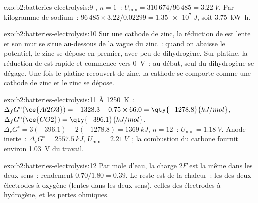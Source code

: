\begin{solution}{exo:b2:batteries-electrolysis:9}
, $n = 1$~: $U_{\min} = 310\,674/96\,485 = \qty{3.22}{V}$.
Par kilogramme de sodium~: $96\,485 \times 3.22/0.02299 = \qty{1.35e7}{J}$, soit
\qty{3.75}{kW.h}.
\end{solution}

\begin{solution}{exo:b2:batteries-electrolysis:10}
Sur une cathode de zinc, la réduction de  est lente et son mur se situe au-dessous de la
vague du zinc~: quand on abaisse le potentiel, le zinc se dépose en premier, avec peu de
dihydrogène. Sur platine, la réduction de  est rapide et commence vers
\qty{0}{V}~: au début, seul du dihydrogène se dégage. Une fois le platine recouvert de
zinc, la cathode se comporte comme une cathode de zinc et le zinc se dépose.
\end{solution}

\begin{solution}{exo:b2:batteries-electrolysis:11}
À \qty{1250}{K}~: $\Delta_f G^\circ(\ce{Al2O3}) = -1328.3 + 0.75 \times 66.0 =
\qty{-1278.8}{kJ/mol}$, $\Delta_f G^\circ(\ce{CO2}) = \qty{-396.1}{kJ/mol}$. $\Delta_r G^\circ =
3(-396.1) - 2(-1278.8) = \qty{1369}{kJ}$, $n = 12$~: $U_{\min} = \qty{1.18}{V}$. Anode inerte~:
$\Delta_r G^\circ = \qty{2557.5}{kJ}$, $U_{\min} = \qty{2.21}{V}$~; la combustion du carbone
fournit environ \qty{1.03}{V} du travail.
\end{solution}

\begin{solution}{exo:b2:batteries-electrolysis:12}
Par mole d'eau, la charge $2F$ est la même dans les deux sens~: rendement $0.70/1.80 =
0.39$. Le reste est de la chaleur~: les  des deux électrodes à oxygène (lentes dans
les deux sens), celles des électrodes à hydrogène, et les pertes ohmiques.
\end{solution}


